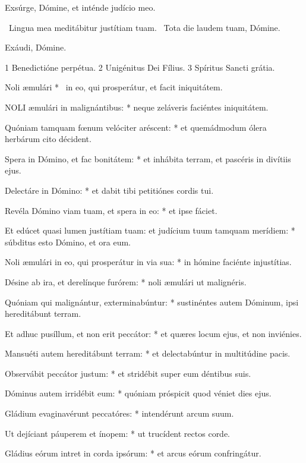  Exsúrge, Dómine, et inténde judício meo.


\V\ Lingua mea meditábitur justítiam tuam. \R\ Tota die laudem tuam, Dómine.

 Exáudi, Dómine.

 1 Benedictióne perpétua. 2 Unigénitus Dei Fílius. 3 Spíritus Sancti grátia.


 Noli æmulári * \textdagger\ in eo, qui prosperátur, et facit iniquitátem.


\lettrine[lines=2]{N}{OLI} æmulári in malignántibus: * neque zeláveris faciéntes iniquitátem.

Quóniam tamquam fœnum velóciter aréscent: * et quemádmodum ólera herbárum cito décident.

Spera in Dómino, et fac bonitátem: * et inhábita terram, et pascéris in divítiis ejus.

Delectáre in Dómino: * et dabit tibi petitiónes cordis tui.

Revéla Dómino viam tuam, et spera in eo: * et ipse fáciet.

Et edúcet quasi lumen justítiam tuam: et judícium tuum tamquam merídiem: * súbditus esto Dómino, et ora eum.

Noli æmulári in eo, qui prosperátur in via sua: * in hómine faciénte injustítias.

Désine ab ira, et derelínque furórem: * noli æmulári ut malignéris.

Quóniam qui malignántur, exterminabúntur: * sustinéntes autem Dóminum, ipsi hereditábunt terram.

Et adhuc pusíllum, et non erit peccátor: * et quæres locum ejus, et non inviénies.

Mansuéti autem hereditábunt terram: * et delectabúntur in multitúdine pacis.

Observábit peccátor justum: * et stridébit super eum déntibus suis.

Dóminus autem irridébit eum: * quóniam próspicit quod véniet dies ejus.

Gládium evaginavérunt peccatóres: * intendérunt arcum suum.

Ut dejíciant páuperem et ínopem: * ut trucídent rectos corde.

Gládius eórum intret in corda ipsórum: * et arcus eórum confringátur.

